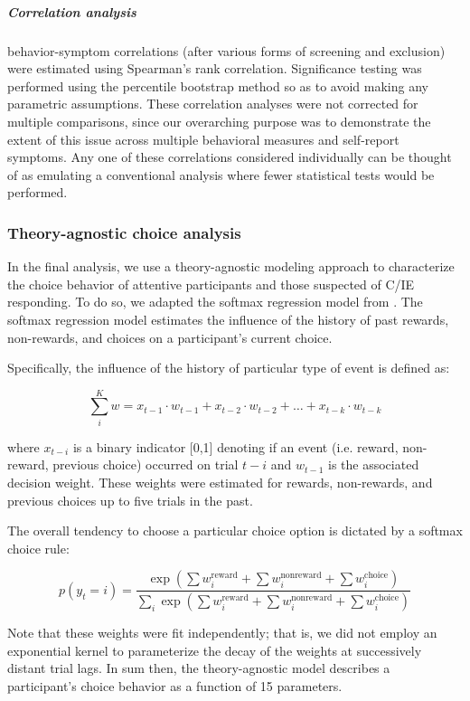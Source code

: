 \documentclass[a4paper,notitlepage,12pt]{article}
\begin{document}
\subparagraph{Correlation analysis} behavior-symptom correlations (after various forms of screening and exclusion) were estimated using Spearman's rank correlation. Significance testing was performed using the percentile bootstrap method \cite{wilcox2018guide} so as to avoid making any parametric assumptions. These correlation analyses were not corrected for multiple comparisons, since our overarching purpose was to demonstrate the extent of this issue across multiple behavioral measures and self-report symptoms. Any one of these correlations considered individually can be thought of as emulating a conventional analysis where fewer statistical tests would be performed.

\subsubsection{Theory-agnostic choice analysis} In the final analysis, we use a theory-agnostic modeling approach to characterize the choice behavior of attentive participants and those suspected of C/IE responding. To do so, we adapted the softmax regression model from \cite{seymour2012serotonin}. The softmax regression model estimates the influence of the history of past rewards, non-rewards, and choices on a participant's current choice. 

Specifically, the influence of the history of particular type of event is defined as:

\begin{equation*}
    \sum_i^K w = x_{t-1} \cdot w_{t-1} + x_{t-2} \cdot w_{t-2} +  \ldots + x_{t-k} \cdot w_{t-k}
\end{equation*}

where $x_{t-i}$ is a binary indicator [0,1] denoting if an event (i.e. reward, non-reward, previous choice) occurred on trial $t-i$ and $w_{t-1}$ is the associated decision weight. These weights were estimated for rewards, non-rewards, and previous choices up to five trials in the past. 

The overall tendency to choose a particular choice option is dictated by a softmax choice rule:

\begin{equation*}
    p(y_t = i) = \frac{ \exp \left( \sum w_i^\text{reward} + \sum w_i^\text{nonreward} + \sum w_i^\text{choice} \right) }{ \sum_i \exp \left( \sum w_i^\text{reward} + \sum w_i^\text{nonreward} + \sum w_i^\text{choice} \right) }
\end{equation*}

Note that these weights were fit independently; that is, we did not employ an exponential kernel to parameterize the decay of the weights at successively distant trial lags. In sum then, the theory-agnostic model describes a participant's choice behavior as a function of 15 parameters. 
\end{document}
